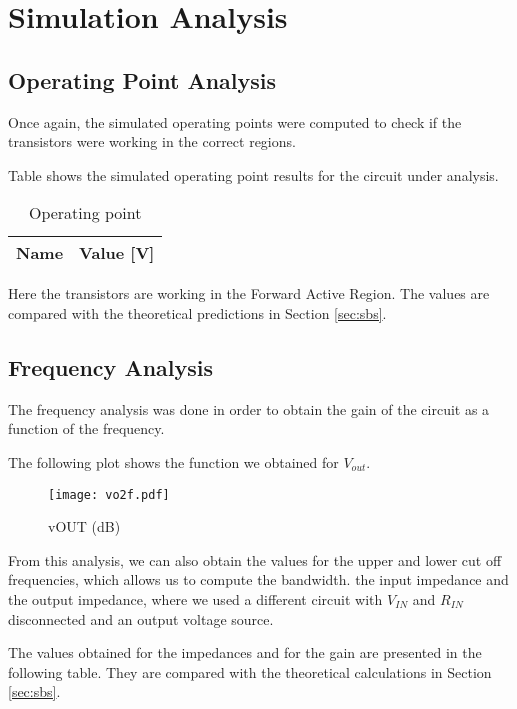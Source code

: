 \section{Simulation Analysis}
\label{sec:simulation}

\subsection{Operating Point Analysis}

Once again, the simulated operating points were computed to check if the transistors were working in the correct regions. \par
Table  shows the simulated operating point results for the circuit
under analysis.

\begin{table}[h]
  \centering
  \begin{tabular}{|l|r|}
    \hline    
    {\bf Name} & {\bf Value [V]} \\ \hline
    
  \end{tabular}
  \caption{Operating point}
  \label{tab:OP_sim}
\end{table}

Here the transistors are working in the Forward Active Region. The values are compared with the theoretical predictions in Section \ref{sec:sbs}.


\subsection{Frequency Analysis}
The frequency analysis was done in order to obtain the gain of the circuit as a function of the frequency. \par
The following plot shows the function we obtained for $V_{out}$.

\begin{figure}[h] \centering
\texttt{[image: vo2f.pdf]}
\caption{vOUT (dB)}
\label{fig:vOUT}
\end{figure}
\FloatBarrier

From this analysis, we can also obtain the values for the upper and lower cut off frequencies, which allows us to compute the bandwidth. the input impedance and the output impedance, where we used a different circuit with $V_{IN}$ and $R_{IN}$ disconnected and an output voltage source. \par
The values obtained for the impedances and for the gain are presented in the following table. They are compared with the theoretical calculations in Section \ref{sec:sbs}.

